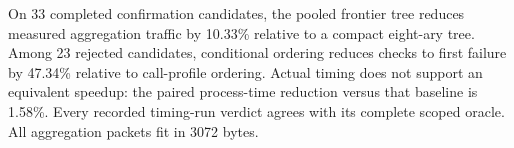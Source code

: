 On 33 completed confirmation candidates, the pooled frontier tree reduces measured aggregation traffic by 10.33\% relative to a compact eight-ary tree. Among 23 rejected candidates, conditional ordering reduces checks to first failure by 47.34\% relative to call-profile ordering. Actual timing does not support an equivalent speedup: the paired process-time reduction versus that baseline is 1.58\%. Every recorded timing-run verdict agrees with its complete scoped oracle. All aggregation packets fit in 3072 bytes.
